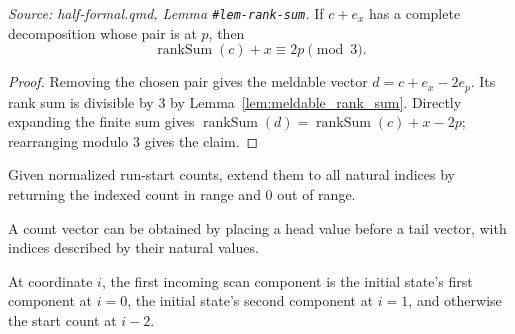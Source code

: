 \begin{lemma}
  \label{lem:complete_rank_sum}
  \textit{Source: half-formal.qmd, Lemma \texttt{\#lem-rank-sum}.}
  If \(c+e_x\) has a complete decomposition whose pair is at \(p\),
  then
  \[
    \operatorname{rankSum}(c)+x\equiv2p\pmod3.
  \]
\end{lemma}
\begin{proof}

\leanok
  Removing the chosen pair gives the meldable vector
  \(d=c+e_x-2e_p\).  Its rank sum is divisible by \(3\) by
  Lemma~\ref{lem:meldable_rank_sum}.  Directly expanding the finite sum
  gives
  \(\operatorname{rankSum}(d)=\operatorname{rankSum}(c)+x-2p\);
  rearranging modulo \(3\) gives the claim.
\end{proof}

\begin{definition}

  \label{def:scan_start_at}
  Given normalized run-start counts, extend them to all natural indices by
  returning the indexed count in range and \(0\) out of range.
\end{definition}

\begin{definition}

  \label{def:counts_cons}
  A count vector can be obtained by placing a head value before a tail
  vector, with indices described by their natural values.
\end{definition}

\begin{definition}

  \label{def:scan_prev2}
  At coordinate \(i\), the first incoming scan component is the initial
  state's first component at \(i=0\), the initial state's second component
  at \(i=1\), and otherwise the start count at \(i-2\).
\end{definition}

